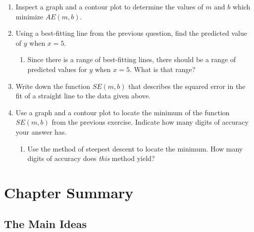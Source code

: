 \begin{enumerate}
\item Inspect a graph and a contour plot to determine the values of $m$
and $b$ which minimize $AE(m, b)$.



\item Using a best-fitting line from the previous question, find the
predicted value of $y$ when $x = 5$.

  \begin{enumerate}
  \item Since there is a range of best-fitting lines, there should be a
range of predicted values for $y$ when $x = 5$.  What is that range?


\end{enumerate}
\item Write down the function $SE(m, b)$ that describes the squared
error in the fit of a straight line to the data given above.


\item Use a graph and a contour plot to locate the minimum of the
function $SE(m, b)$ from the previous exercise.  Indicate how many
digits of accuracy your answer has.


  \begin{enumerate}
  \item Use the method of steepest descent to locate the minimum.  How
many digits of accuracy does {\em this\/} method yield?



\end{enumerate}
\end{enumerate}
\section{Chapter Summary}
\label{sec:chapter-summary}

\subsection{The Main Ideas}
\label{subsec:the-main-ideas}

